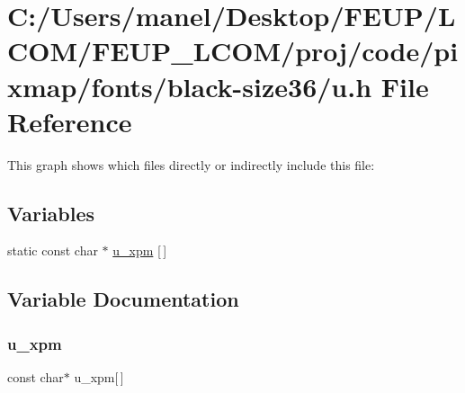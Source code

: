 \hypertarget{black-size36_2u_8h}{}\section{C\+:/\+Users/manel/\+Desktop/\+F\+E\+U\+P/\+L\+C\+O\+M/\+F\+E\+U\+P\+\_\+\+L\+C\+O\+M/proj/code/pixmap/fonts/black-\/size36/u.h File Reference}
\label{black-size36_2u_8h}
This graph shows which files directly or indirectly include this file\+:
\subsection*{Variables}
\begin{DoxyCompactItemize}
\item 
static const char $\ast$ \mbox{\hyperlink{black-size36_2u_8h_a5a9e6c93e19e50821d740f6f11cebaa4}{u\+\_\+xpm}} \mbox{[}$\,$\mbox{]}
\end{DoxyCompactItemize}


\subsection{Variable Documentation}
\mbox{\label{black-size36_2u_8h_a5a9e6c93e19e50821d740f6f11cebaa4}} 
\subsubsection{\texorpdfstring{u\_xpm}{u\_xpm}}
{\footnotesize\ttfamily const char$\ast$ u\+\_\+xpm\mbox{[}$\,$\mbox{]}\hspace{0.3cm}{\ttfamily [static]}}

